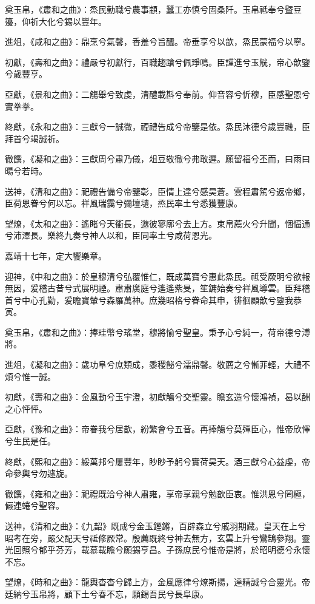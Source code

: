 奠玉帛，《肅和之曲》：烝民勤職兮農事顓，蠶工亦慎兮固桑阡。玉帛祗奉兮暨豆籩，仰祈大化兮錫以豐年。

進俎，《咸和之曲》：鼎烹兮氣馨，香羞兮旨醽。帝垂享兮以歆，烝民蒙福兮以寧。

初獻，《壽和之曲》：禮嚴兮初獻行，百職趨蹌兮佩琤鳴。臣謹進兮玉觥，帝心歆鑒兮歲豐亨。

亞獻，《景和之曲》：二觴舉兮致虔，清醴載斟兮奉前。仰音容兮忻穆，臣感聖恩兮實拳拳。

終獻，《永和之曲》：三獻兮一誠微，禋禮告成兮帝鑒是依。烝民沐德兮歲豐禨，臣拜首兮竭誠祈。

徹饌，《凝和之曲》：三獻周兮肅乃儀，俎豆敬徹兮弗敢遲。願留福兮丕而，曰雨曰暘兮若時。

送神，《清和之曲》：祀禮告備兮帝鑒彰，臣情上達兮感昊蒼。雲程肅駕兮返帝鄉，臣荷恩眷兮何以忘。祥風瑞靄兮彌壇壝，烝民率土兮悉獲豐康。

望燎，《太和之曲》：遙睹兮天衢長，邈彼寥廓兮去上方。束帛薦火兮升聞，悃愊通兮沛澤長。樂終九奏兮神人以和，臣同率土兮咸荷恩光。

嘉靖十七年，定大饗樂章。

迎神，《中和之曲》：於皇穆清兮弘覆惟仁，既成萬寶兮惠此烝民。祗受厥明兮欲報無因，爰稽古昔兮式展明禋。肅肅廣庭兮遙遙紫旻，笙鏞始奏兮祥風導雲。臣拜稽首兮中心孔勤，爰瞻寶輦兮森羅萬神。庶幾昭格兮眷命其申，徘徊顧歆兮鑒我恭寅。

奠玉帛，《肅和之曲》：捧珪幣兮瑤堂，穆將愉兮聖皇。秉予心兮純一，荷帝德兮溥將。

進俎，《凝和之曲》：歲功阜兮庶類成，黍稷飶兮濡鼎馨。敬薦之兮慚菲輕，大禮不煩兮惟一誠。

初獻，《壽和之曲》：金風動兮玉宇澄，初獻觴兮交聖靈。瞻玄造兮懷鴻禎，曷以酬之心怦怦。

亞獻，《豫和之曲》：帝眷我兮居歆，紛繁會兮五音。再捧觴兮莫殫臣心，惟帝欣懌兮生民是任。

終獻，《熙和之曲》：綏萬邦兮屢豐年，眇眇予躬兮實荷昊天。酒三獻兮心益虔，帝命參輿兮勿遽旋。

徹饌，《雍和之曲》：祀禮既洽兮神人肅雍，享帝享親兮勉歆臣衷。惟洪恩兮罔極，儼連蜷兮聖容。

送神，《清和之曲》：《九韶》既成兮金玉鏗鏘，百辟森立兮戚羽期藏。皇天在上兮昭考在旁，嚴父配天兮祗修厥常。殷薦既終兮神去無方，玄雲上升兮鸞鵠參翔。靈光回照兮郁乎芬芳，載慕載瞻兮願錫亨昌。子孫庶民兮惟帝是將，於昭明德兮永懷不忘。

望燎，《時和之曲》：龍輿杳杳兮歸上方，金風應律兮燎斯揚，達精誠兮合靈光。帝廷納兮玉帛將，顧下土兮春不忘，願錫吾民兮長阜康。

